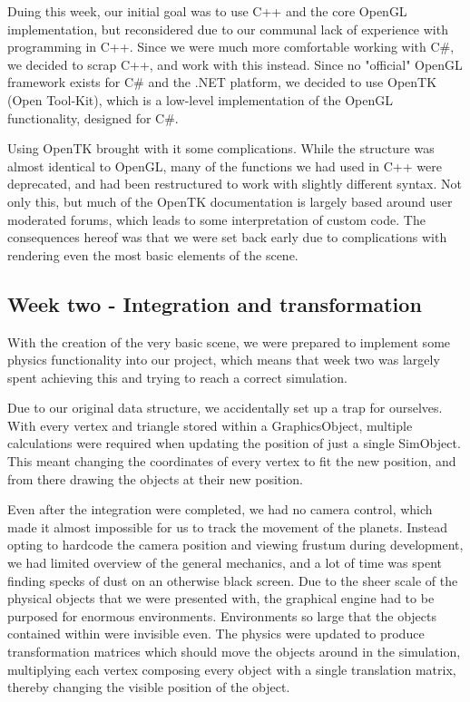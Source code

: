 Duing this week, our initial goal was to use C++ and the core OpenGL implementation, but reconsidered due to our communal lack of experience with programming in C++. Since we were much more comfortable working with C\#, we decided to scrap C++, and work with this instead. Since no "official" OpenGL framework exists for C\# and the .NET platform, we decided to use OpenTK (Open Tool-Kit), which is a low-level implementation of the OpenGL functionality, designed for C\#.

Using OpenTK brought with it some complications. While the structure was almost identical to OpenGL, many of the functions we had used in C++ were deprecated, and had been restructured to work with slightly different syntax. Not only this, but much of the OpenTK documentation is largely based around user moderated forums, which leads to some interpretation of custom code. The consequences hereof was that we were set back early due to complications with rendering even the most basic elements of the scene.

\subsection{Week two - Integration and transformation}
With the creation of the very basic scene, we were prepared to implement some physics functionality into our project, which means that week two was largely spent achieving this and trying to reach a correct simulation.

Due to our original data structure, we accidentally set up a trap for ourselves. With every vertex and triangle stored within a GraphicsObject, multiple calculations were required when updating the position of just a single SimObject. This meant changing the coordinates of every vertex to fit the new position, and from there drawing the objects at their new position.

Even after the integration were completed, we had no camera control, which made it almost impossible for us to track the movement of the planets. Instead opting to hardcode the camera position and viewing frustum during development, we had limited overview of the general mechanics, and a lot of time was spent finding specks of dust on an otherwise black screen. Due to the sheer scale of the physical objects that we were presented with, the graphical engine had to be purposed for enormous environments. Environments so large that the objects contained within were invisible even.
The physics were updated to produce transformation matrices which should move the objects around in the simulation, multiplying each vertex composing every object with a single translation matrix, thereby changing the visible position of the object.

